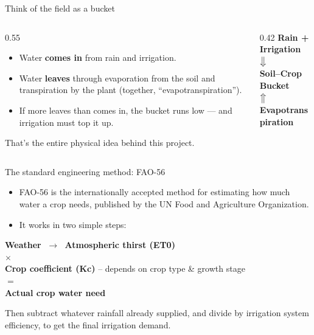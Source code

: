 \documentclass[11pt,aspectratio=169]{beamer}
\begin{document}
\begin{frame}{Think of the field as a bucket}
  \begin{columns}[T]
    \begin{column}{0.55\textwidth}
      \begin{itemize}
        \item Water \textbf{comes in} from rain and irrigation.
        \item Water \textbf{leaves} through evaporation from the soil and
          transpiration by the plant (together, ``evapotranspiration'').
        \item If more leaves than comes in, the bucket runs low --- and
          irrigation must top it up.
      \end{itemize}
      \vspace{0.5em}
      That's the entire physical idea behind this project.
    \end{column}
    \begin{column}{0.42\textwidth}
      \centering
      \small
      \textcolor{deepteal}{\textbf{Rain + Irrigation}} \\[0.3em]
      $\big\Downarrow$ \\[0.3em]
      \textcolor{leaf}{\textbf{Soil--Crop Bucket}} \\[0.3em]
      $\big\Uparrow$ \\[0.3em]
      \textcolor{amber!80!black}{\textbf{Evapotranspiration}}
    \end{column}
  \end{columns}
\end{frame}

\begin{frame}{The standard engineering method: FAO-56}
  \begin{itemize}
    \item FAO-56 is the internationally accepted method for estimating how much
      water a crop needs, published by the UN Food and Agriculture Organization.
    \item It works in two simple steps:
  \end{itemize}
  \begin{center}
    \small
    \textbf{Weather} $\;\rightarrow\;$ \textbf{Atmospheric thirst (ET0)} \\[0.2em]
    $\times$ \\[0.2em]
    \textbf{Crop coefficient (Kc)} \; -- depends on crop type \& growth stage \\[0.2em]
    $=$ \\[0.2em]
    \textbf{Actual crop water need}
  \end{center}
  Then subtract whatever rainfall already supplied, and divide by irrigation
  system efficiency, to get the final \alert{irrigation demand}.
\end{frame}
\end{document}
